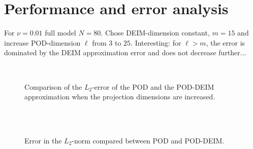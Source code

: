 \section{Performance and error analysis}
For $\nu = 0.01$ full model $N = 80$. Chose DEIM-dimension constant, $m = 15$ and increase POD-dimension $\ell$ from $3$ to $25$. Interesting: for $\ell > m$, the error is dominated by the DEIM approximation error and does not decrease further...
\begin{figure}[H]
\centering
{}\\
\caption{Comparison of the $L_2$-error of the POD and the POD-DEIM approximation when the projection dimensions are increased.}\label{L2err}
\end{figure}

\begin{figure}[H]
\centering
{}\hfill
{}\hfill
{}\hfill \\
\hfill
{}\hfill
{}\hfill \\
\caption{Error in the $L_2$-norm compared between POD and POD-DEIM.}\label{YerrL2}
\end{figure}

